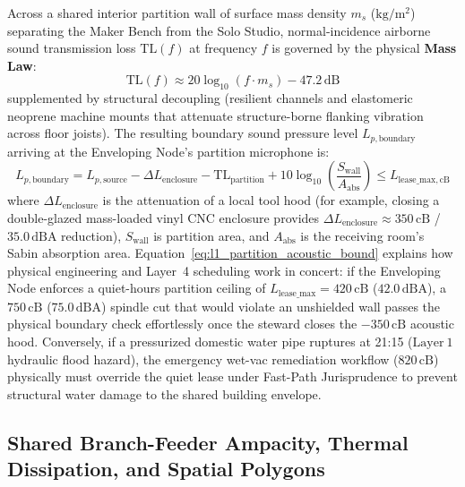Across a shared interior partition wall of surface mass density $m_s$ ($\mathrm{kg/m^2}$) separating the Maker Bench from the Solo Studio, normal-incidence airborne sound transmission loss $\mathrm{TL}(f)$ at frequency $f$ is governed by the physical \textbf{Mass Law}:
\begin{equation}
\mathrm{TL}(f) \approx 20 \log_{10}\left(f \cdot m_s\right) - 47.2\,\mathrm{dB}
\label{eq:l1_acoustic_mass_law}
\end{equation}
supplemented by structural decoupling (resilient channels and elastomeric neoprene machine mounts that attenuate structure-borne flanking vibration across floor joists). The resulting boundary sound pressure level $L_{p,\mathrm{boundary}}$ arriving at the Enveloping Node's partition microphone is:
\begin{equation}
L_{p,\mathrm{boundary}} = L_{p,\mathrm{source}} - \Delta L_{\mathrm{enclosure}} - \mathrm{TL}_{\mathrm{partition}} + 10\log_{10}\left(\frac{S_{\mathrm{wall}}}{A_{\mathrm{abs}}}\right) \le L_{\mathrm{lease\_max,cB}}
\label{eq:l1_partition_acoustic_bound}
\end{equation}
where $\Delta L_{\mathrm{enclosure}}$ is the attenuation of a local tool hood (for example, closing a double-glazed mass-loaded vinyl CNC enclosure provides $\Delta L_{\mathrm{enclosure}} \approx 350\,\mathrm{cB}$ / $35.0\,\mathrm{dBA}$ reduction), $S_{\mathrm{wall}}$ is partition area, and $A_{\mathrm{abs}}$ is the receiving room's Sabin absorption area. Equation~\eqref{eq:l1_partition_acoustic_bound} explains how physical engineering and Layer~4 scheduling work in concert: if the Enveloping Node enforces a quiet-hours partition ceiling of $L_{\mathrm{lease\_max}} = 420\,\mathrm{cB}$ ($42.0\,\mathrm{dBA}$), a $750\,\mathrm{cB}$ ($75.0\,\mathrm{dBA}$) spindle cut that would violate an unshielded wall passes the physical boundary check effortlessly once the steward closes the $-350\,\mathrm{cB}$ acoustic hood. Conversely, if a pressurized domestic water pipe ruptures at 21:15 ($\mathrm{Layer~1}$ hydraulic flood hazard), the emergency wet-vac remediation workflow ($820\,\mathrm{cB}$) physically must override the quiet lease under Fast-Path Jurisprudence to prevent structural water damage to the shared building envelope.

\subsection{Shared Branch-Feeder Ampacity, Thermal Dissipation, and Spatial Polygons}

